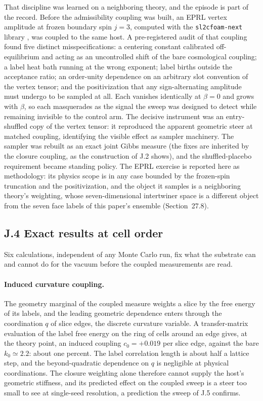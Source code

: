 \documentclass[11pt]{article}
\begin{document}
That discipline was learned on a neighboring theory, and the episode is part of the record. Before the admissibility coupling was built, an EPRL vertex amplitude \citep{EPRL2008} at frozen boundary spin $j=3$, computed with the \texttt{sl2cfoam-next} library \citep{Gozzini2021}, was coupled to the same host. A pre-registered audit of that coupling found five distinct misspecifications: a centering constant calibrated off-equilibrium and acting as an uncontrolled shift of the bare cosmological coupling; a label heat bath running at the wrong exponent; label births outside the acceptance ratio; an order-unity dependence on an arbitrary slot convention of the vertex tensor; and the positivization that any sign-alternating amplitude must undergo to be sampled at all. Each vanishes identically at $\beta=0$ and grows with $\beta$, so each masquerades as the signal the sweep was designed to detect while remaining invisible to the control arm. The decisive instrument was an entry-shuffled copy of the vertex tensor: it reproduced the apparent geometric steer at matched coupling, identifying the visible effect as sampler machinery. The sampler was rebuilt as an exact joint Gibbs measure (the fixes are inherited by the closure coupling, as the construction of J.2 shows), and the shuffled-placebo requirement became standing policy. The EPRL exercise is reported here as methodology: its physics scope is in any case bounded by the frozen-spin truncation and the positivization, and the object it samples is a neighboring theory's weighting, whose seven-dimensional intertwiner space is a different object from the seven face labels of this paper's ensemble (Section~27.8).

\subsection*{J.4 Exact results at cell order}

Six calculations, independent of any Monte Carlo run, fix what the substrate can and cannot do for the vacuum before the coupled measurements are read.

\paragraph{Induced curvature coupling.} The geometry marginal of the coupled measure weights a slice by the free energy of its labels, and the leading geometric dependence enters through the coordination $q$ of slice edges, the discrete curvature variable. A transfer-matrix evaluation of the label free energy on the ring of cells around an edge gives, at the theory point, an induced coupling $c_0=+0.019$ per slice edge, against the bare $k_0\simeq2.2$: about one percent. The label correlation length is about half a lattice step, and the beyond-quadratic dependence on $q$ is negligible at physical coordinations. The closure weighting alone therefore cannot supply the host's geometric stiffness, and its predicted effect on the coupled sweep is a steer too small to see at single-seed resolution, a prediction the sweep of J.5 confirms.
\end{document}
